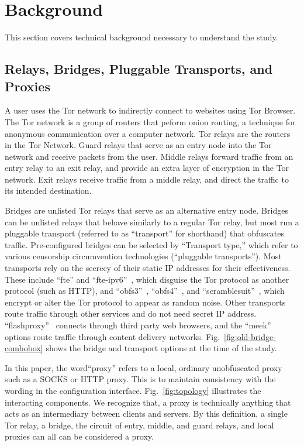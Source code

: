 \documentclass[USenglish,oneside,twocolumn]{article}
\begin{document}
\section{Background}
\label{sec:background}
This section covers technical background necessary to understand the study. 

\subsection{Relays, Bridges, Pluggable Transports, and Proxies} 

 A user uses the Tor network to indirectly connect to websites using Tor Browser. The Tor network is a group of routers that peform onion routing, a technique for anonymous communication over a computer network.  Tor relays are the routers in the Tor Network. 
Guard relays that serve as an entry node into the Tor network and receive packets from the user. Middle relays forward traffic from an entry relay to an exit relay, and provide an extra layer of encryption in the Tor network. Exit relays receive traffic from a middle relay, and direct the traffic to its intended destination. 

Bridges are unlisted Tor relays that serve as an alternative entry node.
Bridges can be unlisted relays that behave similarly to a regular Tor relay,  
but most run a pluggable transport (referred to as ``transport'' for shorthand) that obfuscates traffic. 
Pre-configured bridges can be selected by ``Transport type,'' which refer to various
censorship circumvention technologies (``pluggable transports'').
Most transports rely on the secrecy of their static IP addresses for their effectiveness.
These include ``fte'' and ``fte-ipv6''~\cite{fte},
which disguise the Tor protocol as another protocol (such as HTTP), and
``obfs3''~\cite{obfs3}, ``obfs4''~\cite{obfs4}, and ``scramblesuit''~\cite{scramblesuit},
which encrypt or alter the Tor protocol to appear as random noise.
Other transports route traffic through other services and do not need secret IP address. 
``flashproxy''~\cite{flashproxy} connects through third party web browsers,
and the ``meek''~\cite{fifield2015blocking} options route traffic
through content delivery networks. Fig.~\ref{fig:old-bridge-combobox} shows the bridge and transport options at the time of the study.

In this paper, the word``proxy'' refers to a local, ordinary unobfuscated proxy such as a SOCKS or HTTP proxy. This is to maintain consistency with the wording in the configuration interface. Fig.~\ref{fig:topology} illustrates the interacting components. We recognize that, a proxy is technically anything that acts as an intermediary between clients and servers. By this definition, a single Tor relay, a bridge, the circuit of entry, middle, and guard relays, and local proxies can all can be considered a proxy. 
\end{document}
